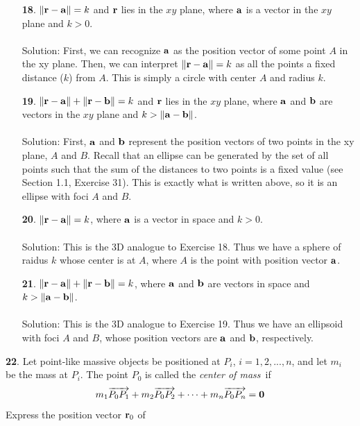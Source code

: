 \documentclass[12pt]{amsbook}
\begin{document}
\begin{enumerate}
  \item[{\small\bf 18}.] $\| {\bf r}-{\bf a}\|=k$ and ${\bf r}$ lies
 in the $xy$ plane, where ${\bf a}$ is a vector in the $xy$ plane
and $k>0$.
\\ 
\\
{\sc Solution}:
First, we can recognize $\bf a$ as the position vector of some point $A$ in the xy plane. Then, we can interpret $\|{\bf r-a}\|=k$ as all the points a fixed distance ($k$) from $A$. This is simply a circle with center $A$ and radius $k$. 
\\
\item[{\small\bf 19}.] $\|{\bf r}-{\bf a}\|+\|{\bf r}-{\bf b}\|=k$ 
and ${\bf r}$ lies
 in the $xy$ plane, where ${\bf a}$ and ${\bf b}$ are vectors in the $xy$ plane
and $k>\|{\bf a}-{\bf b}\|$.
\\ 
\\
{\sc Solution}: First, $\bf a$ and $\bf b$ represent the position vectors of two points in the xy plane, $A$ and $B$. Recall that an ellipse can be generated by the set of all points such that the sum of the distances to two points is a fixed value (see Section 1.1, Exercise 31). This is exactly what is written above, so it is an ellipse with foci $A$ and $B$.
\\
\item[{\small\bf 20}.] $\| {\bf r}-{\bf a}\|=k$,
where ${\bf a}$ is a vector in space
and $k>0$.
\\ 
\\
{\sc Solution}:
This is the 3D analogue to Exercise 18. Thus we have a sphere of raidus $k$ whose center is at $A$, where $A$ is the point with position vector $\bf a$.
\\
\item[{\small\bf 21}.] $\|{\bf r}-{\bf a}\|+\|{\bf r}-{\bf b}\|=k$,
where ${\bf a}$ and ${\bf b}$ are vectors in space
and $k>\|{\bf a}-{\bf b}\|$.
\\ 
\\
{\sc Solution}:
This is the 3D analogue to Exercise 19. Thus we have an ellipsoid with foci $A$ and $B$, whose position vectors are $\bf a$ and $\bf b$, respectively.
\end{enumerate}
{\small\bf 22}. Let point-like massive objects be positioned at $P_i$,
$i=1,2,...,n$, and let $m_i$ be the mass at $P_i$. The point $P_0$
is called the {\it center of mass}~if 
$$ m_1 \overrightarrow{P_0P_1}+m_2\overrightarrow{P_0P_2}
+\cdots+m_n\overrightarrow{P_0P_n}={\bf 0} 
$$ 
Express the position vector ${\bf r}_0$ of 
\end{document}
